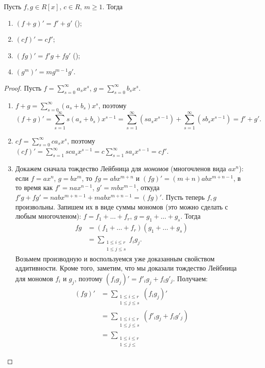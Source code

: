 
\begin{proposition}\label{prop:derivative-properties}
Пусть $f,g\in R[x]$, $c\in R$, $m\geq 1$. Тогда
\begin{enumerate}
\item $(f+g)'=f'+g'$
  ();
\item $(cf)'=cf'$;
\item $(fg)'=f'g+fg'$ ();
\item $(g^m)'=mg^{m-1}g'$.
\end{enumerate}
\end{proposition}
\begin{proof}
Пусть $f=\sum_{s=0}^\infty{a_sx^s}$, $g=\sum_{s=0}^\infty{b_sx^s}$.
\begin{enumerate}
\item $f+g=\sum_{s=0}^\infty{(a_s+b_s)x^s}$, поэтому
$$(f+g)'=\sum_{s=1}^\infty{s(a_s+b_s)x^{s-1}}=
\sum_{s=1}^\infty(sa_sx^{s-1})+\sum_{s=1}^\infty(sb_sx^{s-1})=
f'+g'.$$
\item $cf=\sum_{s=0}^\infty ca_sx^s$, поэтому
$(cf)'=\sum_{s=1}^\infty{sca_sx^{s-1}}=
c\sum_{s=1}^\infty{sa_sx^{s-1}}= cf'$.
\item Докажем сначала тождество Лейбница для {\it мономов}
(многочленов вида $ax^n$): если $f=ax^n$, $g=bx^m$, то $fg=abx^{m+n}$
и $(fg)'=(m+n)abx^{m+n-1}$, в то время как $f'=nax^{n-1}$,
$g'=mbx^{m-1}$, откуда $f'g+fg'=nabx^{m+n-1}+mabx^{m+n-1}=(fg)'$.
Пусть теперь $f,g$ произвольны. Запишем их в виде суммы мономов (это
можно сделать с любым многочленом): $f=f_1+\dots+f_r$,
$g=g_1+\dots+g_s$.
Тогда 
\begin{align*}
fg&=(f_1+\dots+f_r)(g_1+\dots+g_s)\\
&=\sum_{\substack{1\leq i\leq r\\1\leq j\leq s}}f_ig_j.
\end{align*}
Возьмем производную и воспользуемся уже доказанным свойством
аддитивности. Кроме того, заметим, что мы доказали тождество Лейбница
для мономов $f_i$ и $g_j$, поэтому
$(f_ig_j)'=f'_ig_j+f_ig'_j$. Получаем:
\begin{align*}
(fg)'&=\sum_{\substack{1\leq i\leq r\\1\leq j\leq
    s}}(f_ig_j)'\\
&=\sum_{\substack{1\leq i\leq r\\1\leq j\leq
    s}}(f'_ig_j+f_ig'_j)\\
&=\sum_{\substack{1\leq i\leq r\\1\leq j\leq
}}
\end{align*}
\end{enumerate}
\end{proof}
